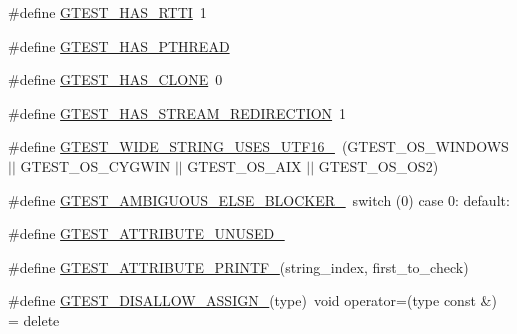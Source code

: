\begin{DoxyCompactItemize}
\item 
\#define \mbox{\hyperlink{googletest-master_2googletest_2include_2gtest_2internal_2gtest-port_8h_a9ba781217167f905bff2f1c410a97930}{G\+T\+E\+S\+T\+\_\+\+H\+A\+S\+\_\+\+R\+T\+TI}}~1
\item 
\#define \mbox{\hyperlink{googletest-master_2googletest_2include_2gtest_2internal_2gtest-port_8h_a3341397e1952de0b9cd88762d4d3ae4b}{G\+T\+E\+S\+T\+\_\+\+H\+A\+S\+\_\+\+P\+T\+H\+R\+E\+AD}}
\item 
\#define \mbox{\hyperlink{googletest-master_2googletest_2include_2gtest_2internal_2gtest-port_8h_a40c075a7f969a694e59532356be59fd5}{G\+T\+E\+S\+T\+\_\+\+H\+A\+S\+\_\+\+C\+L\+O\+NE}}~0
\item 
\#define \mbox{\hyperlink{googletest-master_2googletest_2include_2gtest_2internal_2gtest-port_8h_add695166eb7b691f93777525d5881062}{G\+T\+E\+S\+T\+\_\+\+H\+A\+S\+\_\+\+S\+T\+R\+E\+A\+M\+\_\+\+R\+E\+D\+I\+R\+E\+C\+T\+I\+ON}}~1
\item 
\#define \mbox{\hyperlink{googletest-master_2googletest_2include_2gtest_2internal_2gtest-port_8h_a0e3904ca8d62334ab5f29c057dceb6a1}{G\+T\+E\+S\+T\+\_\+\+W\+I\+D\+E\+\_\+\+S\+T\+R\+I\+N\+G\+\_\+\+U\+S\+E\+S\+\_\+\+U\+T\+F16\+\_\+}}~(G\+T\+E\+S\+T\+\_\+\+O\+S\+\_\+\+W\+I\+N\+D\+O\+WS $\vert$$\vert$ G\+T\+E\+S\+T\+\_\+\+O\+S\+\_\+\+C\+Y\+G\+W\+IN $\vert$$\vert$ G\+T\+E\+S\+T\+\_\+\+O\+S\+\_\+\+A\+IX $\vert$$\vert$ G\+T\+E\+S\+T\+\_\+\+O\+S\+\_\+\+O\+S2)
\item 
\#define \mbox{\hyperlink{googletest-master_2googletest_2include_2gtest_2internal_2gtest-port_8h_a00b3684a621ce1422b55a0e7e8a6aecb}{G\+T\+E\+S\+T\+\_\+\+A\+M\+B\+I\+G\+U\+O\+U\+S\+\_\+\+E\+L\+S\+E\+\_\+\+B\+L\+O\+C\+K\+E\+R\+\_\+}}~switch (0) case 0\+: default\+:
\item 
\#define \mbox{\hyperlink{googletest-master_2googletest_2include_2gtest_2internal_2gtest-port_8h_a01f3b31960fc7c4c7ee4b398a914f89a}{G\+T\+E\+S\+T\+\_\+\+A\+T\+T\+R\+I\+B\+U\+T\+E\+\_\+\+U\+N\+U\+S\+E\+D\+\_\+}}
\item 
\#define \mbox{\hyperlink{googletest-master_2googletest_2include_2gtest_2internal_2gtest-port_8h_ae29b00ca46783509cc900cd03d61ef37}{G\+T\+E\+S\+T\+\_\+\+A\+T\+T\+R\+I\+B\+U\+T\+E\+\_\+\+P\+R\+I\+N\+T\+F\+\_\+}}(string\+\_\+index,  first\+\_\+to\+\_\+check)
\item 
\#define \mbox{\hyperlink{googletest-master_2googletest_2include_2gtest_2internal_2gtest-port_8h_ac593b50ce24257d5b6aa84845c344c9e}{G\+T\+E\+S\+T\+\_\+\+D\+I\+S\+A\+L\+L\+O\+W\+\_\+\+A\+S\+S\+I\+G\+N\+\_\+}}(type)~void operator=(type const \&) = delete
$$
\end{DoxyCompactItemize}
